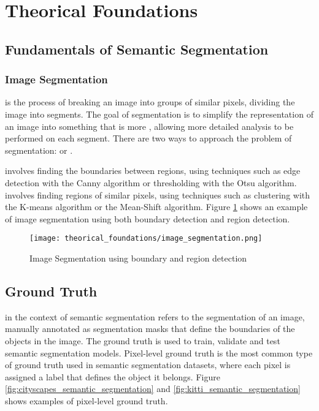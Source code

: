 \section{Theorical Foundations}

  \subsection{Fundamentals of Semantic Segmentation}

    \subsubsection{Image Segmentation}

       is the process of breaking an image into groups of similar
      pixels\cite{intelligence2021modern}, dividing the image into segments. The
      goal of segmentation is to simplify the representation of an image into something
      that is more , allowing more detailed analysis to be performed
      on each segment. There are two ways to approach the problem of segmentation:
       or \cite{intelligence2021modern}.

       involves finding the boundaries between regions, using techniques
      such as edge detection with the Canny algorithm\cite{canny1986computational} or
      thresholding with the Otsu algorithm\cite{otsu1979threshold}. 
      involves finding regions of similar pixels, using techniques such as clustering
      with the K-means algorithm\cite{macqueen1965some} or the Mean-Shift algorithm\cite{comaniciu2002mean}.
      Figure \ref{fig:image_segmentation} shows an example of image segmentation using
      both boundary detection and region detection.

      \begin{figure}[htbp]
        \centering
        \texttt{[image: theorical\_foundations/image\_segmentation.png]}
        \caption{Image Segmentation using boundary and region detection \cite{intelligence2021modern}}
        \label{fig:image_segmentation}
      \end{figure}

    \subsection{Ground Truth}

       in the context of semantic segmentation refers to the
       segmentation of an image, manually annotated as segmentation masks
      that define the boundaries of the objects in the image\cite{intelligence2021modern}.
      The ground truth is used to train, validate and test semantic segmentation models. Pixel-level
      ground truth is the most common type of ground truth used in semantic segmentation
      datasets, where each pixel is assigned a label that defines the object it belongs.
      Figure \ref{fig:cityscapes_semantic_segmentation} and \ref{fig:kitti_semantic_segmentation}
      shows examples of pixel-level ground truth.
 
